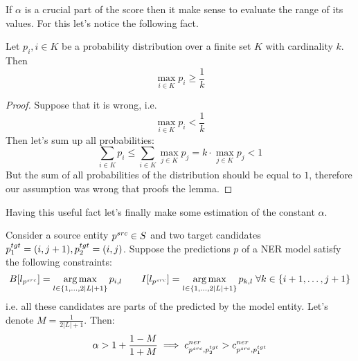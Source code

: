 If \( \alpha \) is a crucial part of the score then it make sense to evaluate the range of its values.
For this let's notice the following fact.
\begin{lemma} \label{lemma:maxprob_greater_than_avg}
  Let \( p_{i}, i \in K \) be a probability distribution over a finite set \( K \) with cardinality \( k \).
  Then
  \[
    \max\limits_{i \in K} p_i \geq \frac{1}{k}
  \]
\end{lemma}
\begin{proof}
  Suppose that it is wrong, i.e.
  \[
    \max\limits_{i \in K} p_i < \frac{1}{k}
  \]
  Then let's sum up all probabilities:
  \[
    \sum\limits_{i \in K} p_i \leq \sum\limits_{i \in K} \max\limits_{j \in K} p_j =
    k \cdot \max\limits_{j \in K} p_j < 1
  \]
  But the sum of all probabilities of the distribution should be equal to \( 1 \), therefore our assumption was
  wrong that proofs the lemma.
\end{proof}
Having this useful fact let's finally make some estimation of the constant \( \alpha \).
\begin{theorem}
  Consider a source entity \( p^{src} \in S \) and two target candidates \( p_1^{tgt} = (i, j+1), p_2^{tgt} = (i, j) \).
  Suppose the predictions \( p \) of a NER model satisfy the following constraints:
  \[
    B[l_{p^{src}}] = \operatorname*{arg\,max}\limits_{l \in \{ 1, \dots, 2|L| + 1 \}} p_{i, l} \qquad
    I[l_{p^{src}}] = \operatorname*{arg\,max}\limits_{l \in \{ 1, \dots, 2|L| + 1 \}} p_{k, l} \; \forall k \in \{ i + 1, \dots ,j +1 \}
  \]
  i.e. all these candidates are parts of the predicted by the model entity.
  Let's denote \( M = \frac{1}{2|L| + 1} \).
  Then:
  \[
    \alpha > 1 + \frac{1 - M}{1 + M} \implies c_{p^{src}, p_2^{tgt}}^{ner} > c_{p^{src}, p_1^{tgt}}^{ner}
  \]
\end{theorem}
